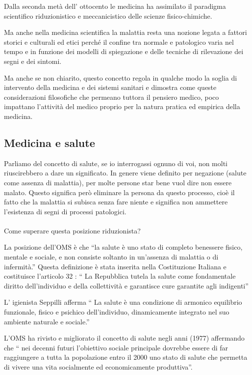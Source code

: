   Dalla seconda metà dell' ottocento le medicina ha assimilato il
  paradigma scientifico riduzionistico e meccanicistico delle scienze
  fisico-chimiche.

  Ma anche nella medicina scientifica la malattia resta una nozione
  legata a fattori storici e culturali ed etici perché il confine tra
  normale e patologico varia nel tempo e in funzione dei modelli di
  spiegazione e delle tecniche di rilevazione dei segni e dei sintomi.

  Ma anche se non chiarito, questo concetto regola in qualche modo la
  soglia di intervento della medicina e dei sistemi sanitari e dimostra
  come queste considerazioni filosofiche che permeano tuttora il
  pensiero medico, poco impattano l'attività del medico proprio per la
  natura pratica ed empirica della medicina.

  \subsection{Medicina e salute}

  Parliamo del concetto di salute, se io interrogassi ognuno di voi, non
  molti riuscirebbero a dare un significato. In genere viene definito
  per negazione (salute come assenza di malattia), per molte persone
  star bene vuol dire non essere malato. Questo significa però eliminare
  la persona da questo processo, cioè il fatto che la malattia si
  subisca senza fare niente e significa non ammettere l'esistenza di
  segni di processi patologici.
\\\\
  Come superare questa posizione riduzionista?

  La posizione dell'OMS è che ``la salute è uno stato di completo
  benessere fisico, mentale e sociale, e non consiste soltanto in
  un'assenza di malattia o di infermità.'' Questa definizione è stata
  inserita nella Costituzione Italiana e costituisce l'articolo 32 : ``
  La Repubblica tutela la salute come fondamentale diritto
  dell'individuo e della collettività e garantisce cure garantite agli
  indigenti''

  L' igienista Seppilli afferma `` La salute è una condizione di
  armonico equilibrio funzionale, fisico e psichico dell'individuo,
  dinamicamente integrato nel suo ambiente naturale e sociale.''

  L'OMS ha rivisto e migliorato il concetto di salute negli anni (1977)
  affermando che `` nei decenni futuri l'obiettivo sociale principale
  dovrebbe essere di far raggiungere a tutta la popolazione entro il
  2000 uno stato di salute che permetta di vivere una vita socialmente
  ed economicamente produttiva''.

